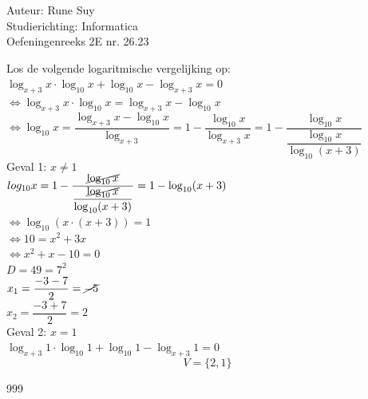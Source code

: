 \documentclass[a4paper]{article}
\begin{document}
  
\noindent \large Auteur: Rune Suy \\
\noindent \large Studierichting: Informatica\\
\noindent \large Oefeningenreeks 2E nr. 26.23\\

\medskip

\normalsize

Los de volgende logaritmische vergelijking op: \\

$\log_{x+3}x \cdot \log_{10}x + \log_{10}x - \log_{x+3}x = 0$\\

$\Leftrightarrow \log_{x+3} x \cdot \log_{10}x = \log_{x+3}x - \log_{10}x$\\

$\Leftrightarrow \log_{10}x = \dfrac{\log_{x+3}x - \log_{10}x}{\log_{x+3}} = 1 - \dfrac{\log_{10}x}{\log_{x+3}x} = 1 - \dfrac{\log_{10}x}{\dfrac{\log_{10}x}{\log_{10}(x+3)}}$\\

Geval 1:  $x \neq 1$\\

$log_{10}x = 1 - \dfrac{\cancel{\log_{10}x}}{\dfrac{\cancel{\log_{10}x}}{\log_{10}(x+3)}} = 1 - \log_{10}(x+3)$\\

$\Leftrightarrow \log_{10}(x \cdot (x+3)) = 1$\\

$\Leftrightarrow 10 = x^2 + 3x$\\

$\Leftrightarrow x^2 + x - 10 = 0$\\

$D = 49 = 7^2$\\

$x_1 = \dfrac{-3-7}{2} = \cancel{-5}$\\

$x_2 = \dfrac{-3+7}{2} = 2$\\

Geval 2: $x=1$\\

$\log_{x+3}1 \cdot \log_{10}1 + \log_{10}1 - \log_{x+3}1 = 0$\\
$$ V = \{2, 1\}$$

\begin{thebibliography}{999}
\end{thebibliography}
\end{document}
